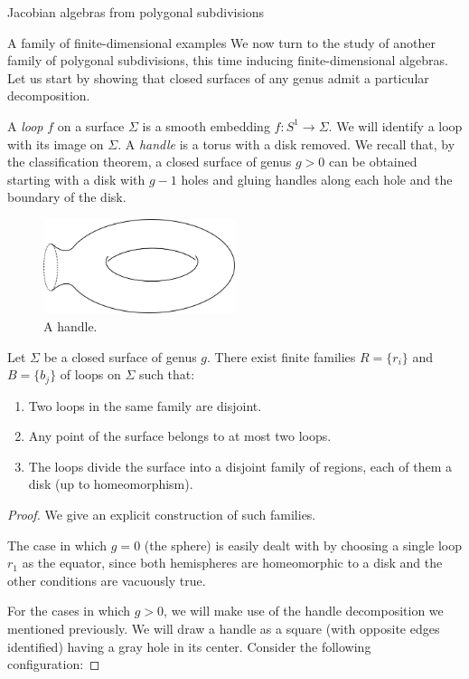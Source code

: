 \begin{chapter}{Jacobian algebras from polygonal subdivisions}
\begin{section}{A family of finite-dimensional examples}
We now turn to the study of another family of polygonal subdivisions, this time inducing finite-dimensional algebras. Let us start by showing that closed surfaces of any genus admit a particular decomposition.

A \emph{loop} $f$ on a surface $\Sigma$ is a smooth embedding $f:S^1\to \Sigma$. We will identify a loop with its image on $\Sigma$. A \emph{handle} is a torus with a disk removed. We recall that, by the classification theorem, a closed surface of genus $g>0$ can be obtained starting with a disk with $g-1$ holes and gluing handles along each hole and the boundary of the disk. 

\begin{figure}[h]
\centering
	\includegraphics[width=0.5\textwidth]{handle.png}
\caption{A handle.}
\end{figure}

\begin{prop}\label{surface-loops} Let $\Sigma$ be a closed surface of genus $g$. There exist finite families $R=\{r_i\}$ and $B=\{b_j\}$ of loops on $\Sigma$ such that:
\begin{enumerate}
\item Two loops in the same family are disjoint.
\item Any point of the surface belongs to at most two loops.
\item The loops divide the surface into a disjoint family of regions, each of them a disk (up to homeomorphism).
\end{enumerate}
\end{prop}

\begin{proof} We give an explicit construction of such families.

The case in which $g=0$ (the sphere) is easily dealt with by choosing a single loop $r_1$ as the equator, since both hemispheres are homeomorphic to a disk and the other conditions are vacuously true.

For the cases in which $g>0$, we will make use of the handle decomposition we mentioned previously. We will draw a handle as a square (with opposite edges identified) having a gray hole in its center. Consider the following configuration:


\end{proof}
\end{section}
\end{chapter}
